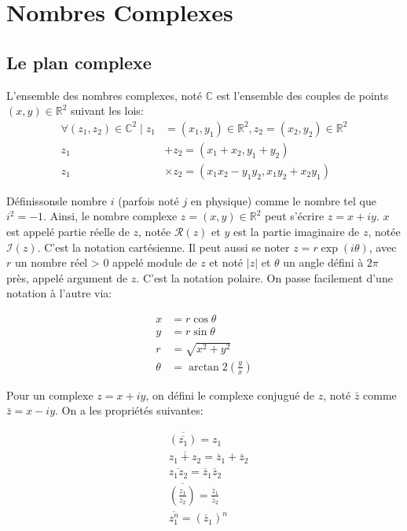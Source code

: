 \chapter{Nombres Complexes}
\section{Le plan complexe}

L'ensemble des nombres complexes, noté $\mathbb{C}$ est l'ensemble des couples de points $(x, y) \in \mathbb{R}^2$ suivant les lois:
\begin{align}
\forall\left(z_1, z_2\right) \in \mathbb{C}^2 \mid z_1 & =\left(x_1, y_1\right) \in \mathbb{R}^2, z_2=\left(x_2, y_2\right) \in \mathbb{R}^2 \\
z_1 & +z_2=\left(x_1+x_2, y_1+y_2\right) \\
z_1 & \times z_2=\left(x_1 x_2-y_1 y_2, x_1 y_2+x_2 y_1\right)
\end{align}

Définissonsle nombre $i$ (parfois noté $j$ en physique) comme le nombre tel que $i^2=-1$. Ainsi, le nombre complexe $z=(x, y) \in \mathbb{R}^2$ peut s'écrire $z=x+i y$. $x$ est appelé partie réelle de $z$, notée $\mathcal{R}(z)$ et $y$ est la partie imaginaire de $z$, notée $\mathcal{I}(z)$. C'est la notation cartésienne. Il peut aussi se noter $z = r \exp(i \theta)$, avec $r$ un nombre réel > 0 appelé module de $z$ et noté $|z|$ et $\theta$ un angle défini à $2\pi$ près, appelé argument de $z$. C'est la notation polaire. On passe facilement d'une notation à l'autre via:

\begin{align}
    x &= r \cos \theta\\
    y &= r \sin \theta\\
    r &= \sqrt{x^2+y^2}\\
    \theta &= \arctan2 \left(\frac{y}{x}\right)
\end{align}

Pour un complexe $z=x+i y$, on défini le complexe conjugué de $z$, noté $\bar{z}$ comme $\bar{z}=x-i y$. On a les propriétés suivantes:

\begin{align} 
    & \overline{\left(\overline{z_1}\right)}=z_{1} \\ 
    & \overline{z_1+z_2}=\overline{z}_{1}+\overline{z}_{2} \\ 
    & \overline{z_1 z_2}=\overline{z}_{1} \overline{z}_{2} \\ 
    & \overline{\left(\frac{z_1}{z_2}\right)}=\frac{\overline{z}_{1}}{\overline{z}_{2}} \\ & \overline{z_1^n}=\left(\overline{z}_{1}\right)^{n}
\end{align}


